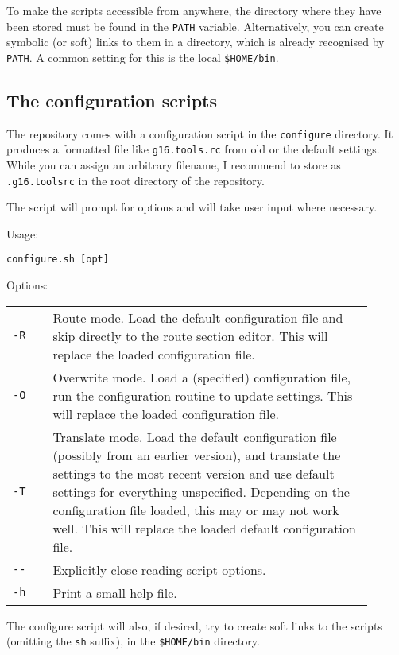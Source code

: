 \documentclass[   %
  final,          %
  a4paper         %
]{article}
\begin{document}
To make the scripts accessible from anywhere, the directory where they have been stored
must be found in the \texttt{PATH} variable.
Alternatively, you can create symbolic (or soft) links to them in a directory, 
which is already recognised by \texttt{PATH}.
A common setting for this is the local \texttt{\$HOME/bin}.

\subsection{The configuration scripts}

The repository comes with a configuration script in the \texttt{configure} directory.
It produces a formatted file like \lstinline`g16.tools.rc` from old or the default settings.
While you can assign an arbitrary filename, 
I recommend to store as \lstinline`.g16.toolsrc` in the root directory of the repository.

The script will prompt for options and will take user input where necessary.

Usage: 

\lstinline`configure.sh [opt]`

Options:

\begin{tabular}{p{0.1\linewidth}p{0.8\linewidth}}
  {\lstinline`-R`}       & Route mode. 
    Load the default configuration file and skip directly to the route section editor.
    This will replace the loaded configuration file.\\
  {\lstinline`-O`}       & Overwrite mode.
    Load a (specified) configuration file, run the configuration routine to update settings.
    This will replace the loaded configuration file.\\
  {\lstinline`-T`}       & Translate mode.
    Load the default configuration file (possibly from an earlier version), 
    and translate the settings to the most recent version and use default settings for everything unspecified.
    Depending on the configuration file loaded, this may or may not work well.
    This will replace the loaded default configuration file.\\
  {\lstinline`--`}       & Explicitly close reading script options. \\
  {\lstinline`-h`}       & Print a small help file. \\
\end{tabular}

The configure script will also, if desired, try to create soft links to the scripts (omitting the \texttt{sh} suffix),
in the \texttt{\$HOME/bin} directory.
\end{document}

